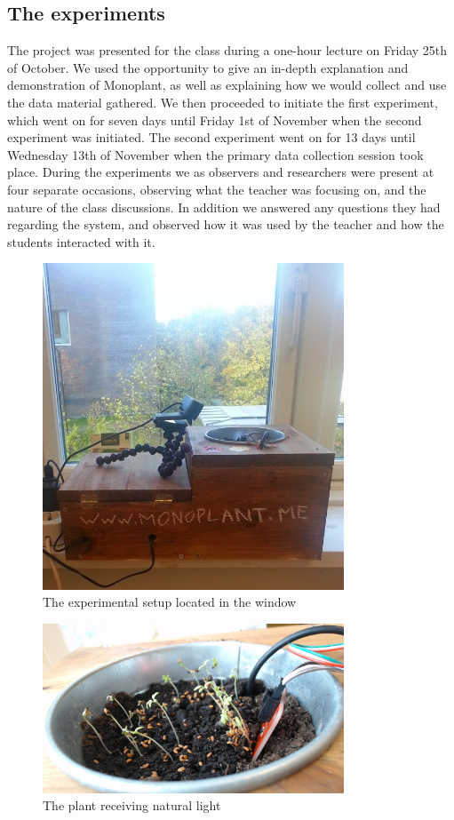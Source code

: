 \subsection{The experiments}
The project was presented for the class during a one-hour lecture on Friday 25th of October. We used the opportunity to give an in-depth explanation and demonstration of Monoplant, as well as explaining how we would collect and use the data material gathered. We then proceeded to initiate the first experiment, which went on for seven days until Friday 1st of November when the second experiment was initiated. The second experiment went on for 13 days until Wednesday 13th of November when the primary data collection session took place. During the experiments we as observers and researchers were present at four separate occasions, observing what the teacher was focusing on, and the nature of the class discussions. In addition we answered any questions they had regarding the system, and observed how it was used by the teacher and how the students interacted with it. 

\begin{figure}
\centering
\includegraphics[width=0.8\textwidth]{img/empiricalsetting/window.jpg}
\caption{The experimental setup located in the window}
\label{fig:windowplant}
\end{figure}

\begin{figure}
\centering
\includegraphics[width=0.8\textwidth]{img/empiricalsetting/windowsystem.jpg}
\caption{The plant receiving natural light}
\label{fig:windowsystemplant}
\end{figure}

